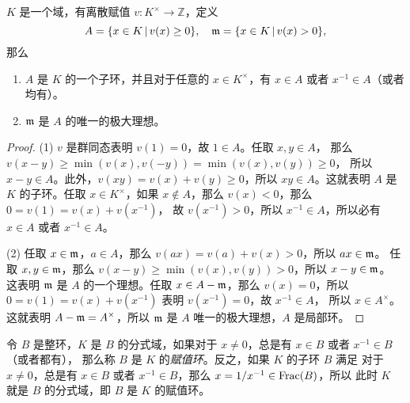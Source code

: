 \begin{proposition}
  $K$ 是一个域，有离散赋值 $v:K^\times\to\mathbb{Z}$，定义
  \[
    A=\{x\in K\,|\, v(x)\geq 0\},\quad \mathfrak{m}=\{x\in K\,|\, v(x)>0\},
  \]
  那么 
  \begin{enumerate}
    \item $A$ 是 $K$ 的一个子环，并且对于任意的 $x\in K^\times$，有 $x\in A$ 或者
    $x^{-1}\in A$（或者均有）。
    \item $\mathfrak{m}$ 是 $A$ 的唯一的极大理想。
  \end{enumerate}
\end{proposition}
\begin{proof}
  (1) $v$ 是群同态表明 $v(1)=0$，故 $1\in A$。任取 $x,y\in A$，
  那么 $v(x-y)\geq \min (v(x),v(-y))=\min(v(x),v(y))\geq 0$，
  所以 $x-y\in A$。此外，$v(xy)=v(x)+v(y)\geq 0$，所以 $xy\in A$。这就表明 $A$ 是
  $K$ 的子环。任取 $x\in K^\times$，如果 $x\notin A$，那么 $v(x)<0$，那么 $0=v(1)=v(x)+v(x^{-1})$，
  故 $v(x^{-1})>0$，所以 $x^{-1}\in A$，所以必有 $x\in A$ 或者 $x^{-1}\in A$。

  (2) 任取 $x\in\mathfrak{m}$，$a\in A$，那么 $v(ax)=v(a)+v(x)>0$，所以 $ax\in\mathfrak{m}$。
  任取 $x,y\in\mathfrak{m}$，那么 $v(x-y)\geq \min(v(x),v(y))>0$，所以 $x-y\in\mathfrak{m}$。
  这表明 $\mathfrak{m}$ 是 $A$ 的一个理想。任取 $x\in A-\mathfrak{m}$，那么
  $v(x)=0$，所以 $0=v(1)=v(x)+v(x^{-1})$ 表明 $v(x^{-1})=0$，故 $x^{-1}\in A$，
  所以 $x\in A^\times$。这就表明 $A-\mathfrak{m}=A^\times$，所以 $\mathfrak{m}$ 是 $A$
  唯一的极大理想，$A$ 是局部环。
\end{proof}

令 $B$ 是整环，$K$ 是 $B$ 的分式域，如果对于 $x\neq 0$，总是有 $x\in B$ 或者 $x^{-1}\in B$（或者都有），
那么称 $B$ 是 $K$ 的\emph{赋值环}。反之，如果 $K$ 的子环 $B$ 满足
对于 $x\neq 0$，总是有 $x\in B$ 或者 $x^{-1}\in B$，那么 $x=1/x^{-1}\in\operatorname{Frac}(B)$，所以
此时 $K$ 就是 $B$ 的分式域，即 $B$ 是 $K$ 的赋值环。

